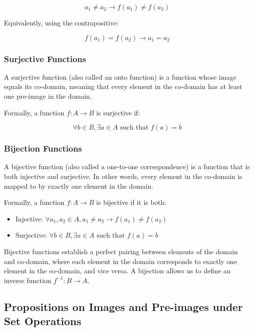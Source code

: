 \[
	a_1 \neq a_2 \to f(a_1) \neq f(a_2)
\]

Equivalently, using the contrapositive:

\[
	f(a_1) = f(a_2) \to a_1 = a_2
\]

\subsubsection{Surjective Functions}

A surjective function (also called an onto function) is a function whose image equals its co-domain, 
meaning that every element in the co-domain has at least one pre-image in the domain.

Formally, a function \(f: A \to B\) is surjective if:

\[
	\forall b \in B, \exists a \in A \text{ such that } f(a) = b
\]

\subsubsection{Bijection Functions}

A bijective function (also called a one-to-one correspondence) is a 
function that is both injective and surjective. In other words, every 
element in the co-domain is mapped to by exactly one element in the domain.

Formally, a function \(f: A \to B\) is bijective if it is both:

\begin{itemize}

	\item Injective: \(\forall a_1, a_2 \in A, a_1 \neq a_2 \to f(a_1) \neq f(a_2)\)

	\item Surjective: \(\forall b \in B, \exists a \in A \text{ such that } f(a) = b\)

\end{itemize}

Bijective functions establish a perfect pairing between elements of the domain and co-domain, where each 
element in the domain corresponds to exactly one element in the co-domain, and vice versa. A bijection 
allows us to define an inverse function \(f^{-1}: B \to A\).

\subsection{Propositions on Images and Pre-images under Set Operations}

